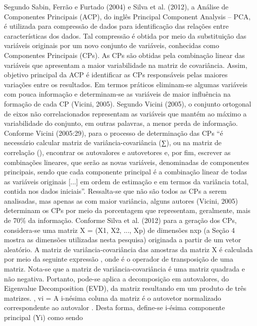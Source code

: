 Segundo Sabin, Ferrão e Furtado (2004) e Silva et al. (2012), a Análise de Componentes Principais (ACP), do inglês Principal Component Analysis – PCA, é utilizada para compressão de dados para identificação das relações entre características dos dados. Tal compressão é obtida por meio da substituição das variáveis originais por um novo conjunto de variáveis, conhecidas como Componentes Principais (CPs). As CPs são obtidas pela combinação linear das variáveis que apresentam a maior variabilidade na matriz de covariância. Assim, objetivo principal da ACP é identificar as CPs responsáveis pelas maiores variações entre os resultados. Em termos práticos eliminam-se algumas variáveis com pouca informação e determinam-se as variáveis de maior influência na formação de cada CP (Vicini, 2005).
Segundo Vicini (2005), o conjunto ortogonal de eixos não correlacionados representam as variáveis que mantém ao máximo a variabilidade do conjunto, em outras palavras, a menor perda de informação. 
Conforme Vicini (2005:29), para o processo de determinação das CPs 
“é necessário calcular matriz de variância-covariância (∑), ou na matriz de correlação (), encontrar os autovalores e autovetores e, por fim, escrever as combinações lineares, que serão as novas variáveis, denominadas de componentes principais, sendo que cada componente principal é a combinação linear de todas as variáveis originais [...] em ordem de estimação e em termos da variância total, contida nos dados iniciais”. 
Ressalta-se que não são todos as CPs a serem analisadas, mas apenas as com maior variância, alguns autores (Vicini, 2005) determinam os CPs por meio da porcentagem que representam, geralmente, mais de 70\% da informação. 
Conforme Silva et al. (2012) para a geração dos CPs, considera-se uma matriz X = (X1, X2, ..., Xp) de dimensões nxp (a Seção 4 mostra as dimensões utilizadas nesta pesquisa) originada a partir de um vetor aleatório. A matriz de variância-covariância  das amostras da matriz X é calculada por meio da seguinte expressão , onde é o operador de transposição de uma matriz. Nota-se que a matriz de variância-covariância é uma matriz quadrada e não negativa. Portanto, pode-se aplica a decomposição em autovalores, do Eigenvalue Decomposition (EVD), da matriz  resultando em um produto de três matrizes.
,
vi = 
A i-nésima coluna da matriz  é o autovetor normalizado  correspondente ao autovalor . Desta forma, define-se i-ésima componente principal (Yi) como sendo

